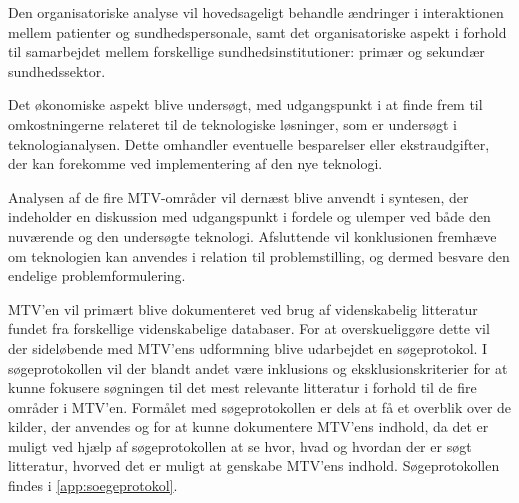 Den organisatoriske analyse vil hovedsageligt behandle ændringer i interaktionen mellem patienter og sundhedspersonale, samt det organisatoriske aspekt i forhold til samarbejdet mellem forskellige sundhedsinstitutioner: primær og sekundær sundhedssektor.

Det økonomiske aspekt blive undersøgt, med udgangspunkt i at finde frem til omkostningerne relateret til de teknologiske løsninger, som er undersøgt i teknologianalysen. 
Dette omhandler eventuelle besparelser eller ekstraudgifter, der kan forekomme ved implementering af den nye teknologi.



Analysen af de fire MTV-områder vil dernæst blive anvendt i syntesen, der indeholder en diskussion med udgangspunkt i fordele og ulemper ved både den nuværende og den undersøgte teknologi. 
Afsluttende vil konklusionen fremhæve om teknologien kan anvendes i relation til problemstilling, og dermed besvare den endelige problemformulering.




MTV’en vil primært blive dokumenteret ved brug af videnskabelig litteratur fundet fra forskellige videnskabelige databaser. For at overskueliggøre dette vil der sideløbende med MTV’ens udformning blive udarbejdet en søgeprotokol. I søgeprotokollen vil der blandt andet være inklusions og eksklusionskriterier for at kunne fokusere søgningen til det mest relevante litteratur i forhold til de fire områder i MTV’en. Formålet med søgeprotokollen er dels at få et overblik over de kilder, der anvendes og for at kunne dokumentere MTV’ens indhold, da det er muligt ved hjælp af søgeprotokollen at se hvor, hvad og hvordan der er søgt litteratur, hvorved det er muligt at genskabe MTV’ens indhold. Søgeprotokollen findes i \autoref{app:soegeprotokol}.





